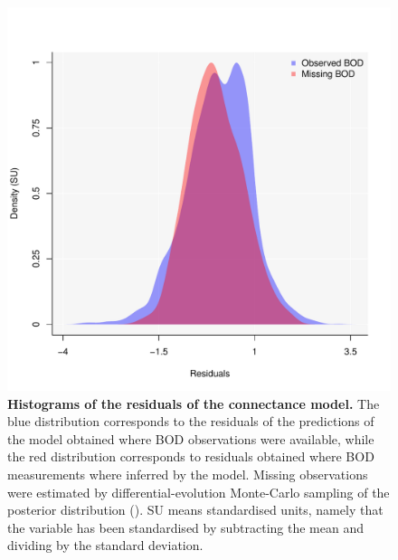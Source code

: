 \documentclass[11pt, oneside]{article}
\begin{document}
\begin{figure}[H]
\begin{center}
\includegraphics[page=1, width=1\linewidth]{b0_6_3/out_con/fig_hist_residuals.pdf}
\caption{
    \textbf{Histograms of the residuals of the connectance model.}
    The blue distribution corresponds to the residuals of the predictions of the model obtained where BOD observations were available, while the red distribution corresponds to residuals obtained where BOD measurements where inferred by the model.
    Missing observations were estimated by differential-evolution Monte-Carlo sampling of the posterior distribution (\cite{TerBraak2006}).
    SU means standardised units, namely that the variable has been standardised by subtracting the mean and dividing by the standard deviation.
} 
\end{center}
\end{figure}
\end{document}
